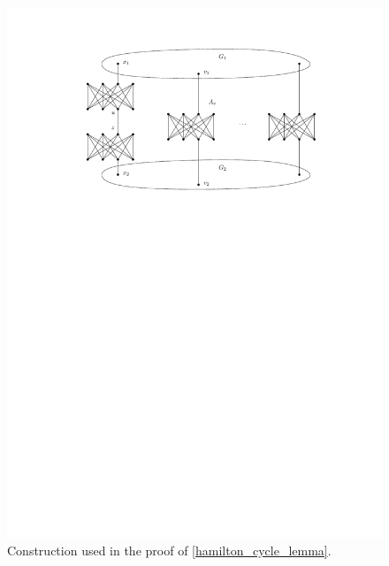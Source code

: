 \documentclass[runningheads]{llncs}
\numberwithin{equation}{section}
\begin{document}
\begin{figure}[htpb]
\centering
\includegraphics[scale=1]{img/hamilton-prime}
\caption{Construction used in the proof of \cref{hamilton_cycle_lemma}.}
\label{fig_hamilton_cycle_lemma}
\end{figure}
\end{document}

